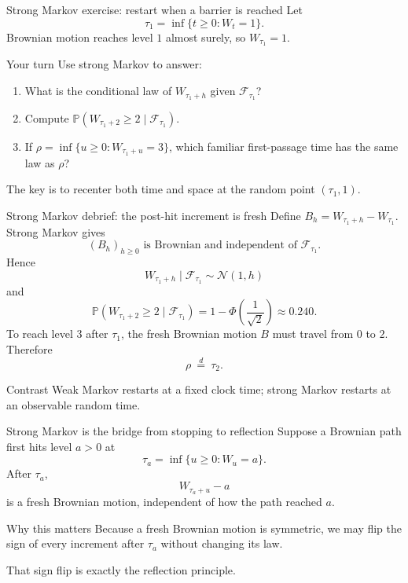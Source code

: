 \documentclass[handout,10pt,aspectratio=169]{beamer}
\newcommand{\Pp}{\mathbb P}
\newcommand{\F}{\mathcal F}
\begin{document}
\begin{frame}{Strong Markov exercise: restart when a barrier is reached}
Let
\[
\tau_1=\inf\{t\ge0:W_t=1\}.
\]
Brownian motion reaches level \(1\) almost surely, so \(W_{\tau_1}=1\).
\begin{block}{Your turn}
Use strong Markov to answer:
\begin{enumerate}\setlength{\itemsep}{0.55em}
  \item What is the conditional law of \(W_{\tau_1+h}\) given \(\F_{\tau_1}\)?
  \item Compute \(\Pp(W_{\tau_1+2}\ge2\mid\F_{\tau_1})\).
  \item If \(\rho=\inf\{u\ge0:W_{\tau_1+u}=3\}\), which familiar first-passage time has the same law as \(\rho\)?
\end{enumerate}
\end{block}
The key is to recenter both time and space at the random point \((\tau_1,1)\).
\end{frame}

\begin{frame}{Strong Markov debrief: the post-hit increment is fresh}
\small
Define \(B_h=W_{\tau_1+h}-W_{\tau_1}\). Strong Markov gives
\[
(B_h)_{h\ge0}\text{ is Brownian and independent of }\F_{\tau_1}.
\]
Hence
\[
W_{\tau_1+h}\mid\F_{\tau_1}\sim\mathcal N(1,h)
\]
and
\[
\Pp(W_{\tau_1+2}\ge2\mid\F_{\tau_1})
=1-\Phi\!\left(\frac1{\sqrt2}\right)
\approx0.240.
\]
To reach level \(3\) after \(\tau_1\), the fresh Brownian motion \(B\) must travel from \(0\) to \(2\). Therefore
\[
\rho\ \overset d=\ \tau_2.
\]
\begin{block}{Contrast}
Weak Markov restarts at a fixed clock time; strong Markov restarts at an observable random time.
\end{block}
\end{frame}

\begin{frame}{Strong Markov is the bridge from stopping to reflection}
Suppose a Brownian path first hits level \(a>0\) at
\[
\tau_a=\inf\{u\ge0:W_u=a\}.
\]
After \(\tau_a\),
\[
W_{\tau_a+u}-a
\]
is a fresh Brownian motion, independent of how the path reached \(a\).
\begin{block}{Why this matters}
Because a fresh Brownian motion is symmetric, we may flip the sign of every increment after \(\tau_a\) without changing its law.
\end{block}
That sign flip is exactly the reflection principle.
\end{frame}
\end{document}
